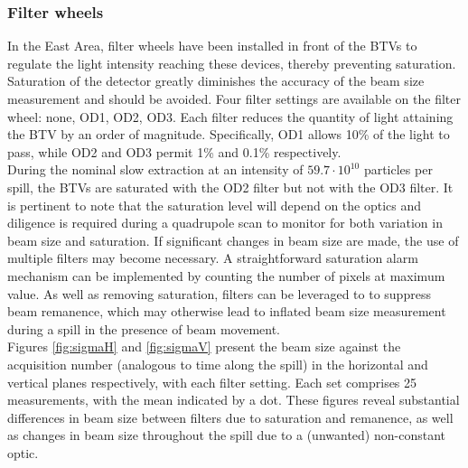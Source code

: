 \subsubsection{Filter wheels}

In the East Area, filter wheels have been installed in front of the BTVs to regulate the light intensity reaching these devices, thereby preventing saturation. Saturation of the detector greatly diminishes the accuracy of the beam size measurement and should be avoided. Four filter settings are available on the filter wheel: none, OD1, OD2, OD3. Each filter reduces the quantity of light attaining the BTV by an order of magnitude. Specifically, OD1 allows 10\% of the light to pass, while OD2 and OD3 permit 1\% and 0.1\% respectively.
\\

During the nominal slow extraction at an intensity of $59.7\cdot10^{10}$ particles per spill, the BTVs are saturated with the OD2 filter but not with the OD3 filter. It is pertinent to note that the saturation level will depend on the optics and diligence is required during a quadrupole scan to monitor for both variation in beam size and saturation. If significant changes in beam size are made, the use of multiple filters may become necessary. A straightforward saturation alarm mechanism can be implemented by counting the number of pixels at maximum value. As well as removing saturation, filters can be leveraged to to suppress beam remanence, which may otherwise lead to inflated beam size measurement during a spill in the presence of beam movement.
\\

Figures \ref{fig:sigmaH} and \ref{fig:sigmaV} present the beam size against the acquisition number (analogous to time along the spill) in the horizontal and vertical planes respectively, with each filter setting. Each set comprises 25 measurements, with the mean indicated by a dot. These figures reveal substantial differences in beam size between filters due to saturation and remanence, as well as changes in beam size throughout the spill due to a (unwanted) non-constant optic.
\\

